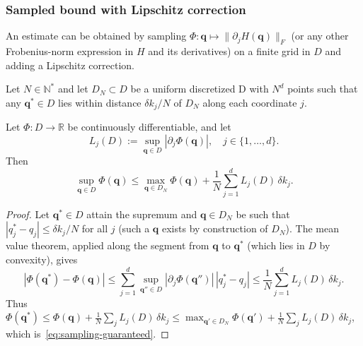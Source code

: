 \documentclass[11pt]{article}
\numberwithin{equation}{section}
\begin{document}
\subsubsection{Sampled bound with Lipschitz correction}\label{sec:bounds-sampling-sup}

An estimate can be obtained by sampling \(\Phi : \mathbf{q} \mapsto \|\partial_j
H(\mathbf{q})\|_F\) (or any other Frobenius-norm expression in \(H\) and its derivatives)
on a finite grid in \(D\) and adding a Lipschitz correction.

Let \(N \in \mathbb{N}^*\) and let \(D_N \subset D\) be a uniform discretized D with
\(N^d\) points such that any \(\mathbf{q}^* \in D\) lies within distance \(\delta k_j /
N\) of \(D_N\) along each coordinate \(j\).

\begin{theorem}\label{thm:sampling}
    Let \(\Phi : D \to \mathbb{R}\) be continuously differentiable, and let
    \begin{equation}
        L_j(D) := \sup_{\mathbf{q} \in D} |\partial_j \Phi(\mathbf{q})|,
        \quad j \in \{1, \dots, d\}.
    \end{equation}
    Then
    \begin{equation}
        \sup_{\mathbf{q} \in D} \Phi(\mathbf{q})
        \leq \max_{\mathbf{q} \in D_N} \Phi(\mathbf{q})
        + \frac{1}{N} \sum_{j=1}^d L_j(D)\, \delta k_j.
        \label{eq:sampling-guaranteed}
    \end{equation}
\end{theorem}

\begin{proof}
    Let \(\mathbf{q}^* \in D\) attain the supremum and \(\mathbf{q} \in D_N\)
    be such that \(|q_j^* - q_j| \leq \delta k_j / N\) for all \(j\) (such a
    \(\mathbf{q}\) exists by construction of \(D_N\)). The mean value theorem,
    applied along the segment from \(\mathbf{q}\) to \(\mathbf{q}^*\) (which
    lies in \(D\) by convexity), gives
    \begin{equation}
        |\Phi(\mathbf{q}^*) - \Phi(\mathbf{q})|
        \leq \sum_{j=1}^d \sup_{\mathbf{q}'' \in D}
        |\partial_j \Phi(\mathbf{q}'')|\, |q_j^* - q_j|
        \leq \frac{1}{N} \sum_{j=1}^d L_j(D)\, \delta k_j.
    \end{equation}
    Thus \(\Phi(\mathbf{q}^*) \leq \Phi(\mathbf{q})
    + \tfrac{1}{N} \sum_j L_j(D)\, \delta k_j
    \leq \max_{\mathbf{q}' \in D_N} \Phi(\mathbf{q}')
    + \tfrac{1}{N} \sum_j L_j(D)\, \delta k_j\), which
    is~\eqref{eq:sampling-guaranteed}.
\end{proof}
\end{document}
